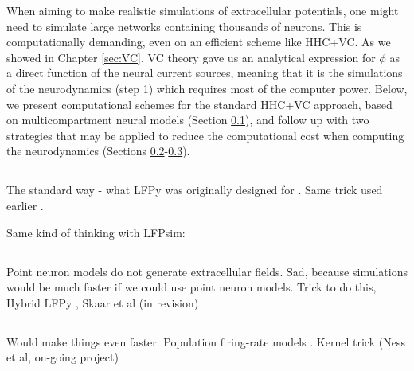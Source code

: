 When aiming to make realistic simulations of extracellular potentials, one might need to simulate large networks containing thousands of neurons. This is computationally demanding, even on an efficient scheme like HHC+VC. As we showed in Chapter \ref{sec:VC}, VC theory gave us an analytical expression for $\phi$ as a direct function of the neural current sources, meaning that it is the simulations of the neurodynamics (step 1) which requires most of the computer power. Below, we present computational schemes for the standard HHC+VC approach, based on multicompartment neural models (Section \ref{sec:Schemes:LFPy}), and follow up with two strategies that may be applied to reduce the computational cost when computing the neurodynamics (Sections \ref{sec:Schemes:HybridLFPy}-\ref{sec:Schemes:KernelLFPy}).


\subsection{}
\label{sec:Schemes:LFPy}

The standard way - what LFPy was originally designed for \citep{Hagen2018}.
Same trick used earlier \citep{Holt1999}.

Same kind of thinking with LFPsim: \citep{parasuram2016}


\subsection{}
\label{sec:Schemes:HybridLFPy}

Point neuron models do not generate extracellular fields. Sad, because simulations would be much faster if we could use point neuron models. Trick to do this, Hybrid LFPy \citep{Hagen2016}, Skaar et al (in revision)


\subsection{}
\label{sec:Schemes:KernelLFPy}

Would make things even faster. Population firing-rate models  \citep{Hagen2016}. Kernel trick (Ness et al, on-going project) 



